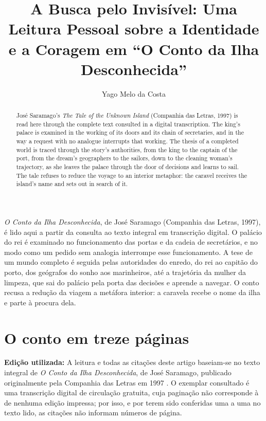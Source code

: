 \documentclass[12pt]{article}
\title{A Busca pelo Invisível: Uma Leitura Pessoal sobre a Identidade e a Coragem em ``O Conto da Ilha Desconhecida''}
\author{Yago Melo da Costa}
\begin{document}
\maketitle

\begin{resumo}
\emph{O Conto da Ilha Desconhecida}, de José Saramago (Companhia das Letras, 1997), é lido aqui a partir da consulta ao texto integral em transcrição digital. O palácio do rei é examinado no funcionamento das portas e da cadeia de secretários, e no modo como um pedido sem analogia interrompe esse funcionamento. A tese de um mundo completo é seguida pelas autoridades do enredo, do rei ao capitão do porto, dos geógrafos do sonho aos marinheiros, até a trajetória da mulher da limpeza, que sai do palácio pela porta das decisões e aprende a navegar. O conto recusa a redução da viagem a metáfora interior: a caravela recebe o nome da ilha e parte à procura dela.
\end{resumo}

\begin{abstract}
José Saramago's \emph{The Tale of the Unknown Island} (Companhia das Letras, 1997) is read here through the complete text consulted in a digital transcription. The king's palace is examined in the working of its doors and its chain of secretaries, and in the way a request with no analogue interrupts that working. The thesis of a completed world is traced through the story's authorities, from the king to the captain of the port, from the dream's geographers to the sailors, down to the cleaning woman's trajectory, as she leaves the palace through the door of decisions and learns to sail. The tale refuses to reduce the voyage to an interior metaphor: the caravel receives the island's name and sets out in search of it.
\end{abstract}

\section{O conto em treze páginas}

\noindent
\textbf{Edição utilizada:} A leitura e todas as citações deste artigo baseiam-se no texto integral de \emph{O Conto da Ilha Desconhecida}, de José Saramago, publicado originalmente pela Companhia das Letras em 1997 \cite{saramago1997}. O exemplar consultado é uma transcrição digital de circulação gratuita, cuja paginação não corresponde à de nenhuma edição impressa; por isso, e por terem sido conferidas uma a uma no texto lido, as citações não informam números de página.
\end{document}

